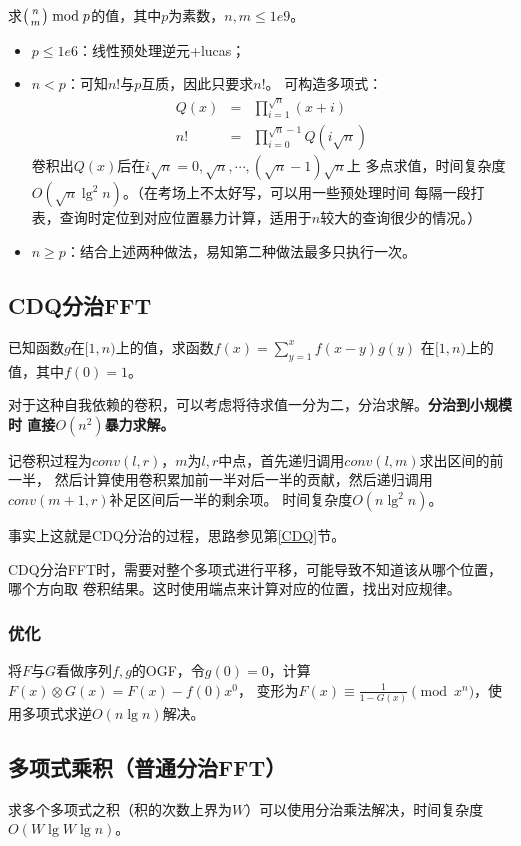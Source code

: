 求$\left(n \atop m\right) \bmod{p}$的值，其中$p$为素数，$n,m\leq 1e9$。

\begin{itemize}
    \item $p\leq 1e6$：线性预处理逆元+lucas；
    \item $n<p$：可知$n!$与$p$互质，因此只要求$n!$。
    可构造多项式：
    \begin{eqnarray*}
        Q(x)&=&\prod_{i=1}^{\sqrt{n}}{(x+i)}\\
        n!&=&\prod_{i=0}^{\sqrt{n}-1}{Q(i\sqrt{n})}
    \end{eqnarray*}
    卷积出$Q(x)$后在$i\sqrt{n}=0,\sqrt{n},\cdots,(\sqrt{n}-1)\sqrt{n}$上
    多点求值，时间复杂度\\$O(\sqrt{n}\lg^2 n)$。（在考场上不太好写，可以用一些预处理时间
    每隔一段打表，查询时定位到对应位置暴力计算，适用于$n$较大的查询很少的情况。）
    \item $n\geq p$：结合上述两种做法，易知第二种做法最多只执行一次。
\end{itemize}

\subsection{CDQ分治FFT}
已知函数$g$在$[1,n)$上的值，求函数$f(x)=\displaystyle \sum_{y=1}^x{f(x-y)g(y)}$
在$[1,n)$上的值，其中$f(0)=1$。

对于这种自我依赖的卷积，可以考虑将待求值一分为二，分治求解。{\bfseries 分治到小规模时
直接$O(n^2)$暴力求解。}

记卷积过程为$conv(l,r)$，$m$为$l,r$中点，首先递归调用$conv(l,m)$求出区间的前一半，
然后计算使用卷积累加前一半对后一半的贡献，然后递归调用$conv(m+1,r)$补足区间后一半的剩余项。
时间复杂度$O(n\lg^2 n)$。

事实上这就是CDQ分治的过程，思路参见第\ref{CDQ}节。

CDQ分治FFT时，需要对整个多项式进行平移，可能导致不知道该从哪个位置，哪个方向取
卷积结果。这时使用端点来计算对应的位置，找出对应规律。
\subsubsection{优化}
将$F$与$G$看做序列$f,g$的OGF，令$g(0)=0$，计算$F(x)\otimes G(x)=F(x)-f(0)x^0$，
变形为$F(x)\equiv \frac{1}{1-G(x)} \pmod{x^n}$，使用多项式求逆$O(n\lg n)$解决。

\subsection{多项式乘积（普通分治FFT）}
求多个多项式之积（积的次数上界为$W$）可以使用分治乘法解决，时间复杂度
$O(W\lg W\lg n)$。

